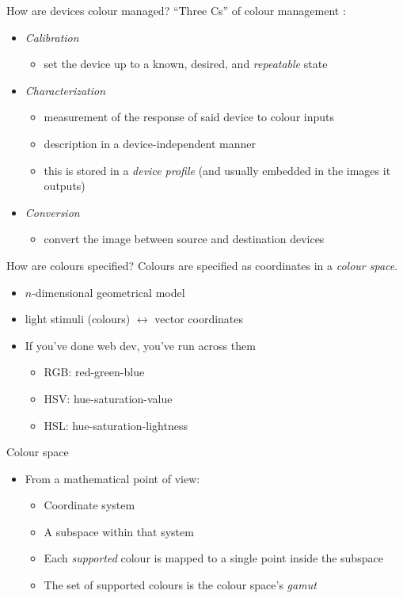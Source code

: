 \documentclass[aspectratio=169]{fireshonks}
\begin{document}
\begin{frame}{How are devices colour managed?}
  \enquote{Three Cs} of colour management \autocite{sharma}:
  \begin{itemize}[<+(1)->]
    \item \emph{Calibration}
          \begin{itemize}
            \item set the device up to a known, desired, and \emph{repeatable} state
          \end{itemize}
    \item \emph{Characterization}
          \begin{itemize}
            \item measurement of the response of said device to colour inputs
            \item description in a device-independent manner
            \item this is stored in a \emph{device profile} (and usually embedded in the images it outputs)
          \end{itemize}
    \item \emph{Conversion}
          \begin{itemize}
            \item convert the image between source and destination devices
          \end{itemize}
  \end{itemize}
\end{frame}
\begin{frame}{How are colours specified?}
  Colours are specified as coordinates in a \emph{colour space}.
  \begin{itemize}[<+(1)->]
    \item $n$-dimensional geometrical model
    \item light stimuli (colours) $\leftrightarrow$ vector coordinates
    \item If you've done web dev, you've run across them
          \begin{itemize}
            \item RGB: red-green-blue
            \item HSV: hue-saturation-value
            \item HSL: hue-saturation-lightness
          \end{itemize}
  \end{itemize}
\end{frame}
\begin{frame}{Colour space}
  \begin{itemize}
    \item From a mathematical point of view:
          \begin{itemize}
            \item Coordinate system
            \item A subspace within that system
            \item Each \emph{supported} colour is mapped to a single point inside the subspace
            \item The set of supported colours is the colour space's \emph{gamut}
          \end{itemize}
  \end{itemize}
\end{frame}
\end{document}
